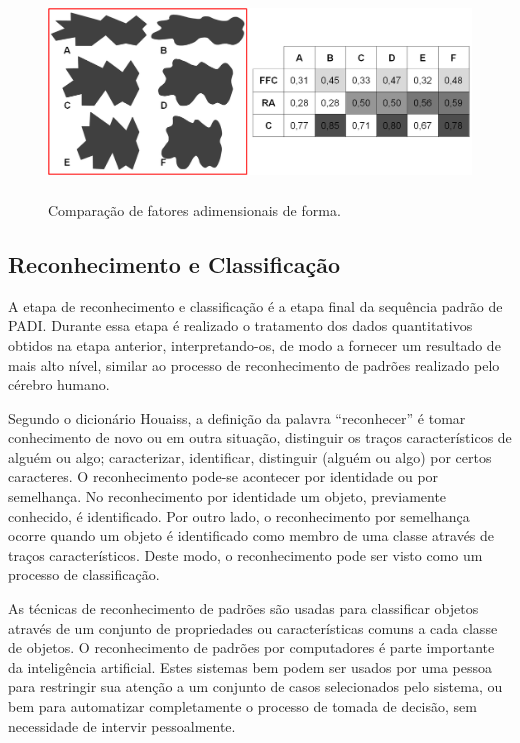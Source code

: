 \begin{figure} [h]
  \begin{center}
    \includegraphics[height=157pt,width=400pt]{images/fig_compara-factform}
    \caption{Comparação de fatores adimensionais de
      forma.\cite{114}}\label{fig:compara-factform}
  \end{center}
\end{figure}

\vspace{20 mm}

\subsection{Reconhecimento e Classificação}

A etapa de reconhecimento e classificação é a etapa final da sequência
padrão de PADI. Durante essa etapa é realizado o tratamento dos dados
quantitativos obtidos na etapa anterior, interpretando-os, de modo a
fornecer um resultado de mais alto nível, similar ao processo de
reconhecimento de padrões realizado pelo cérebro humano.

Segundo o dicionário Houaiss, a definição da palavra ``reconhecer'' é
tomar conhecimento de novo ou em outra situação, distinguir os traços
característicos de alguém ou algo; caracterizar, identificar,
distinguir (alguém ou algo) por certos caracteres.\cite{116} O
reconhecimento pode-se acontecer por identidade ou por semelhança. No
reconhecimento por identidade um objeto, previamente conhecido, é
identificado. Por outro lado, o reconhecimento por semelhança ocorre
quando um objeto é identificado como membro de uma classe através de
traços característicos. Deste modo, o reconhecimento pode ser visto
como um processo de classificação.\cite{30}

As técnicas de reconhecimento de padrões são usadas para classificar
objetos através de um conjunto de propriedades ou características
comuns a cada classe de objetos.\cite{117} O reconhecimento de padrões
por computadores é parte importante da inteligência artificial. Estes
sistemas bem podem ser usados por uma pessoa para restringir sua
atenção a um conjunto de casos selecionados pelo sistema, ou bem para
automatizar completamente o processo de tomada de decisão, sem
necessidade de intervir pessoalmente.\cite{30}

